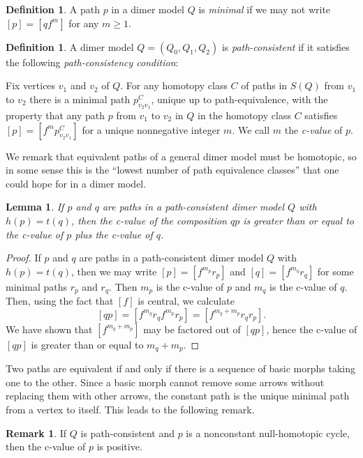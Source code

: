 \documentclass{article}
\newtheorem{lemma}[thm]{Lemma}
\theoremstyle{definition}
\newtheorem{defn}[thm]{Definition}
\newtheorem{remk}[thm]{Remark}
\begin{document}
\begin{defn}
	A path $p$ in a dimer model $Q$ is \textit{minimal} if we may not write $[p]=[qf^m]$ for any $m\geq1$.
\end{defn}

\begin{defn}\label{defn:algebraic-consistency}
	A dimer model $Q=(Q_0,Q_1,Q_2)$ is \textit{path-consistent} if it satisfies the following \textit{path-consistency condition}:

         \indent\indent\hangindent=1cm Fix vertices $v_1$ and $v_2$ of $Q$. For any homotopy class $C$ of paths in $S(Q)$ from $v_1$ to $v_2$ there is a minimal path $p_{v_2v_1}^C$, unique up to path-equivalence, with the property that any path $p$ from $v_1$ to $v_2$ in $Q$ in the homotopy class $C$ satisfies $[p]=[f^mp_{v_2v_1}^C]$ for a unique nonnegative integer $m$.  We call $m$ the \textit{c-value} of $p$.
\end{defn}

We remark that equivalent paths of a general dimer model must be homotopic, so in some sense this is the ``lowest number of path equivalence classes'' that one could hope for in a dimer model.

\begin{lemma}\label{lem:c-values-compose}
    If $p$ and $q$ are paths in a path-consistent dimer model $Q$ with $h(p)=t(q)$, then the c-value of the composition $qp$ is greater than or equal to the c-value of $p$ plus the c-value of $q$.
\end{lemma}
\begin{proof}
    If $p$ and $q$ are paths in a path-consistent dimer model $Q$ with $h(p)=t(q)$, then we may write $[p]=[f^{m_p}r_p]$ and $[q]=[f^{m_q}r_q]$ for some minimal paths $r_p$ and $r_q$. Then $m_p$ is the c-value of $p$ and $m_q$ is the c-value of $q$. Then, using the fact that $[f]$ is central, we calculate
    \[[qp]=[f^{m_q}r_qf^{m_p}r_p]=[f^{m_q+m_p}r_qr_p].\]
	We have shown that $[f^{m_q+m_p}]$ may be factored out of $[qp]$, hence the c-value of $[qp]$ is greater than or equal to $m_q+m_p$.
\end{proof}


Two paths are equivalent if and only if there is a sequence of basic morphs taking one to the other. Since a basic morph cannot remove some arrows without replacing them with other arrows, the constant path is the unique minimal path from a vertex to itself. This leads to the following remark.

\begin{remk}\label{rem:cycle-cant-be-constant}
    If $Q$ is path-consistent and $p$ is a nonconstant null-homotopic cycle, then the c-value of $p$ is positive.
\end{remk}
\end{document}
